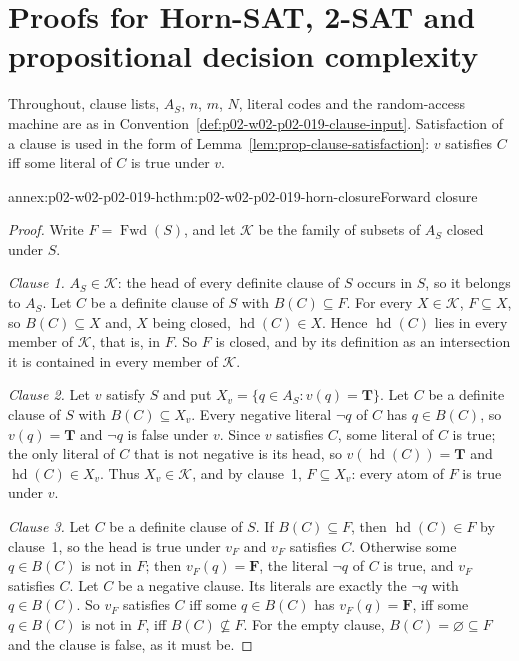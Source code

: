 \section{Proofs for Horn-SAT, 2-SAT and propositional decision complexity}
\label{sec:annex-p02-w02-p02-019-sat-procedures}

Throughout, clause lists, \(A_S\), \(n\), \(m\), \(N\), literal codes and the
random-access machine are as in
Convention~\ref{def:p02-w02-p02-019-clause-input}.  Satisfaction of a clause
is used in the form of Lemma~\ref{lem:prop-clause-satisfaction}: \(v\)
satisfies \(C\) iff some literal of \(C\) is true under \(v\).

\begin{annexitem}{annex:p02-w02-p02-019-hc}{thm:p02-w02-p02-019-horn-closure}{Forward closure}
\begin{proof}
Write \(F=\operatorname{Fwd}(S)\), and let \(\mathcal K\) be the family of
subsets of \(A_S\) closed under \(S\).

\emph{Clause 1.}  \(A_S\in\mathcal K\): the head of every definite clause of
\(S\) occurs in \(S\), so it belongs to \(A_S\).  Let \(C\) be a definite
clause of \(S\) with \(B(C)\subseteq F\).  For every \(X\in\mathcal K\),
\(F\subseteq X\), so \(B(C)\subseteq X\) and, \(X\) being closed,
\(\operatorname{hd}(C)\in X\).  Hence \(\operatorname{hd}(C)\) lies in every
member of \(\mathcal K\), that is, in \(F\).  So \(F\) is closed, and by its
definition as an intersection it is contained in every member of
\(\mathcal K\).

\emph{Clause 2.}  Let \(v\) satisfy \(S\) and put
\(X_v=\{q\in A_S: v(q)=\mathbf{T}\}\).  Let \(C\) be a definite clause of \(S\)
with \(B(C)\subseteq X_v\).  Every negative literal \(\neg q\) of \(C\) has
\(q\in B(C)\), so \(v(q)=\mathbf{T}\) and \(\neg q\) is false under \(v\).  Since
\(v\) satisfies \(C\), some literal of \(C\) is true; the only literal of \(C\)
that is not negative is its head, so \(v(\operatorname{hd}(C))=\mathbf{T}\) and
\(\operatorname{hd}(C)\in X_v\).  Thus \(X_v\in\mathcal K\), and by clause~1,
\(F\subseteq X_v\): every atom of \(F\) is true under \(v\).

\emph{Clause 3.}  Let \(C\) be a definite clause of \(S\).  If
\(B(C)\subseteq F\), then \(\operatorname{hd}(C)\in F\) by clause~1, so the
head is true under \(v_F\) and \(v_F\) satisfies \(C\).  Otherwise some
\(q\in B(C)\) is not in \(F\); then \(v_F(q)=\mathbf{F}\), the literal \(\neg q\)
of \(C\) is true, and \(v_F\) satisfies \(C\).  Let \(C\) be a negative clause.
Its literals are exactly the \(\neg q\) with \(q\in B(C)\).  So \(v_F\)
satisfies \(C\) iff some \(q\in B(C)\) has \(v_F(q)=\mathbf{F}\), iff some
\(q\in B(C)\) is not in \(F\), iff \(B(C)\not\subseteq F\).  For the empty
clause, \(B(C)=\varnothing\subseteq F\) and the clause is false, as it must
be.


\end{proof}
\end{annexitem}
